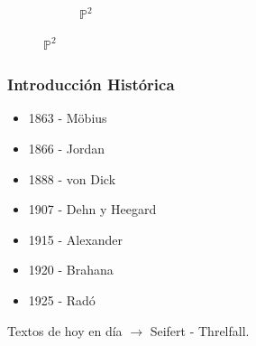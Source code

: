\documentclass{beamer}
\newcommand{\Proyectivo}{\mathbb{P}^2}
\theoremstyle{definition}
\begin{document}
\begin{frame}
\begin{figure}
\begin{subfigure}{0.3\textwidth}
\begin{tikzpicture} [scale=.5]

\end{tikzpicture}
\caption{$\Proyectivo$}
\end{subfigure}
\end{figure}
\end{frame}




\begin{frame}
\frametitle{Introducción Histórica}
\begin{itemize}
\item 1863 - Möbius
\item 1866 - Jordan
\item 1888 - von Dick
\item 1907 - Dehn y Heegard
\item 1915 - Alexander
\item 1920 - Brahana
\item 1925 - Radó\pause
\end{itemize}

Textos de hoy en día $\longrightarrow$ Seifert - Threlfall.

\end{frame}

\end{document}
